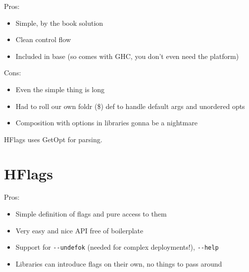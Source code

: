 \documentclass[]{article}
\newenvironment{Shaded}{}{}
\newcommand{\KeywordTok}[1]{\textcolor[rgb]{0.00,0.44,0.13}{\textbf{{#1}}}}
\newcommand{\DataTypeTok}[1]{\textcolor[rgb]{0.56,0.13,0.00}{{#1}}}
\newcommand{\DecValTok}[1]{\textcolor[rgb]{0.25,0.63,0.44}{{#1}}}
\newcommand{\StringTok}[1]{\textcolor[rgb]{0.25,0.44,0.63}{{#1}}}
\newcommand{\OtherTok}[1]{\textcolor[rgb]{0.00,0.44,0.13}{{#1}}}
\newcommand{\FunctionTok}[1]{\textcolor[rgb]{0.02,0.16,0.49}{{#1}}}
\newcommand{\NormalTok}[1]{{#1}}
\begin{document}
Pros:

\begin{itemize}
\item
  Simple, by the book solution
\item
  Clean control flow
\item
  Included in base (so comes with GHC, you don't even need the platform)
\end{itemize}

Cons:

\begin{itemize}
\item
  Even the simple thing is long
\item
  Had to roll our own foldr (\$) def to handle default args and
  unordered opts
\item
  Composition with options in libraries gonna be a nightmare
\end{itemize}

HFlags uses GetOpt for parsing.

\section{HFlags}

\begin{Shaded}
\end{Shaded}

Pros:

\begin{itemize}
\item
  Simple definition of flags and pure access to them
\item
  Very easy and nice API free of boilerplate
\item
  Support for \texttt{-{}-undefok} (needed for complex deployments!),
  \texttt{-{}-help}
\item
  Libraries can introduce flags on their own, no things to pass around
\end{itemize}
\end{document}
